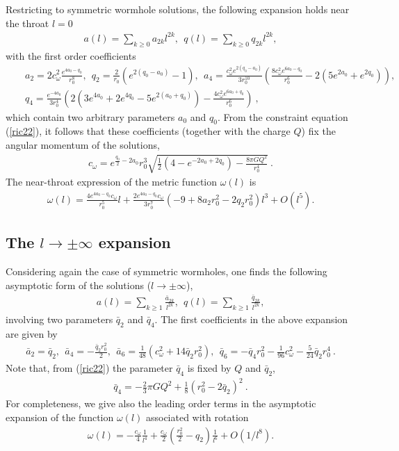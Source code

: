 \documentclass[showpacs,preprintnumbers,amsmath,amssymb,floatfix]{revtex4}
\begin{document}
\begin{appendix}
Restricting to symmetric wormhole solutions, the following expansion holds near the throat $l=0$ 
\begin{eqnarray}
a(l)=\sum_{k\geq 0} {  a_{2k}}{l^{2k}},~~q(l)=\sum_{k\geq 0} { q_{2k}}{l^{2k}}, 
\end{eqnarray}
with the first order coefficients
\begin{eqnarray}
&&
a_2=2c_\omega^2\frac{e^{4a_0-q_0}}{r_0^8},~~
q_2=\frac{2}{r_0}(e^{2(q_0-a_0)}-1),~~
a_4=\frac{c_\omega^2e^{2(q_0-a_0)}}{3r_0^{10}}
\left(\frac{8c_\omega^2e^{6a_0-q_0}}{r_0^6}
-2(5e^{2a_0}+e^{2q_0})
\right )
,
\\
\nonumber
&&
q_4=\frac{ e^{-4a_0}}{3r_0^4}
\left (
2(3  e^{4a_0}+2e^{4q_0}-5e^{2(a_0+q_0)} )
-\frac{4c_\omega^2e^{6a_0+q_0}}{r_0^6}
\right)~,
\end{eqnarray}
which contain two arbitrary parameters
$a_0$ and $q_0$. From the constraint equation (\ref{ric22}), 
it follows that these coefficients (together with the charge $Q$) fix the angular momentum
of the solutions,
\begin{eqnarray}
c_\omega=e^{\frac{q_0}{2}-2a_0}r_0^3 \sqrt{\frac{1}{2}(4-e^{-2a_0+2q_0})-\frac{8\pi G Q^2}{r_0^4}} \ .
\end{eqnarray}
The near-throat expression of the metric function $\omega(l)$ is
\begin{eqnarray}
\omega(l)=
\frac{4 e^{4a_0-q_0}c_\omega}{r_0^5} l
+\frac{2e^{4a_0-q_0}c_\omega}{3 r_0^7}(-9+8a_2r_0^2-2q_2r_0^2) l^3
+O(l^5).
\end{eqnarray}


\subsection{The $l \to \pm \infty$ expansion}
Considering again the case of  symmetric wormholes,
one finds the following asymptotic form of the solutions ($l \to \pm \infty$), 
\begin{eqnarray}
a(l)=\sum_{k\geq 1}\frac{\bar a_{2k}}{l^{2k}},~~q(l)=\sum_{k\geq 1}\frac{\bar q_{2k}}{l^{2k}}, 
\end{eqnarray}
involving two  parameters
$\bar q_2$ and $\bar q_4$.
The first coefficients in the above expansion are given by
\begin{eqnarray}
\bar a_2=\bar q_2,~~
\bar a_4=-\frac{\bar q_2r_0^2}{2},~~
\bar a_6=\frac{1}{48}(c_\omega^2+14 \bar q_2r_0^2),~~
\bar q_6=-\bar q_4 r_0^2-\frac{1}{96}c_\omega^2-\frac{5}{24}\bar q_2r_0^4 \ .
\end{eqnarray}
Note that, from (\ref{ric22}) the parameter $\bar q_4$ is fixed by $Q$ and $\bar q_2$,
\begin{eqnarray}
\bar q_4=-\frac{2}{3}\pi G Q^2+\frac{1}{8}(r_0^2-2\bar q_2)^2 \ .
\end{eqnarray}
For completeness, we give also the leading order terms in the asymptotic expansion
of the function $\omega(l)$ associated with rotation  
\begin{eqnarray}
\omega(l)=-\frac{c_\omega}{4 }\frac{1}{l^4}+\frac{c_\omega}{2}(\frac{r_0^2}{2}-q_2)\frac{1}{l^6}+O(1/l^8).
\end{eqnarray}


\end{appendix}
\end{document}

